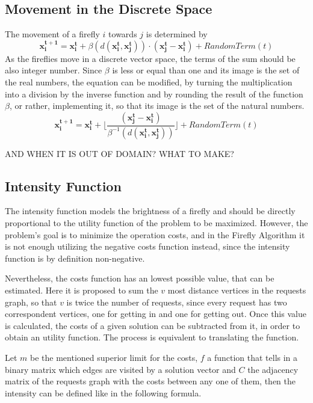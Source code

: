 \documentclass[tuberlin,cic,tc,openright,english,noabntcite]{iiufrgs}
\begin{document}
\subsection{Movement in the Discrete Space}
The movement of a firefly $i$ towards $j$ is determined by $$\mathbf{x^{t+1}_i} = \mathbf{x^{t}_i} + \beta(d(\mathbf{x^{t}_i}, \mathbf{x^{t}_j})) \cdot (\mathbf{x^{t}_j} - \mathbf{x^{t}_i}) + RandomTerm(t)$$
As the fireflies move in a discrete vector space, the terms of the sum should be also integer number. Since $\beta$ is less or equal than one and its image is the set of the real numbers, the equation can be modified, by turning the multiplication into a division by the inverse function and by rounding the result of the function $\beta$, or rather, implementing it, so that its image is the set of the natural numbers.
$$\mathbf{x^{t+1}_i} = \mathbf{x^{t}_i} +  \lfloor \frac{(\mathbf{x^{t}_j} - \mathbf{x^{t}_i})}{\beta^{-1}(d(\mathbf{x^{t}_i}, \mathbf{x^{t}_j}))} \rfloor + RandomTerm(t)$$

AND WHEN IT IS OUT OF DOMAIN? WHAT TO MAKE?

\subsection{Intensity Function}
The intensity function models the brightness of a firefly and should be directly proportional to the utility function of the problem to be maximized. However, the problem's goal is to minimize the operation costs, and in the Firefly Algorithm it is not enough utilizing the negative costs function instead, since the intensity function is by definition non-negative.

Nevertheless, the costs function has an lowest possible value, that can be estimated. Here it is proposed to sum the $v$ most distance vertices in the requests graph, so that $v$ is twice the number of requests, since every request has two correspondent vertices, one for getting in and one for getting out. Once this value is calculated, the costs of a given solution can be subtracted from it, in order to obtain an utility function. The process is equivalent to translating the function.

Let $m$ be the mentioned superior limit for the costs, $f$ a function that tells in a binary matrix which edges are visited by a solution vector and $C$ the adjacency matrix of the requests graph with the costs between any one of them, then the intensity can be defined like in the following formula.
\end{document}
